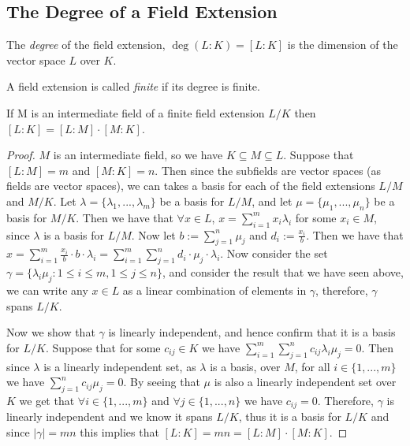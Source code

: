 \subsection{The Degree of a Field Extension}
\begin{definition}
    The \textit{degree} of the field extension, $\deg(L:K)=[L:K]$ is the dimension of the vector space $L$ over $K$.
\end{definition}
\begin{definition}
    A field extension is called \textit{finite} if its degree is finite. 
\end{definition}
\begin{theorem} \label{thm:tower-theorem}
    If M is an intermediate field of a finite field extension $L/K$ then
$
    [L:K] = [L:M]\cdot[M:K]
$. 
\end{theorem}
\begin{proof}
$M$ is an intermediate field, so we have $K \subseteq M \subseteq L$. Suppose that $[L:M]=m$ and $[M:K]=n$. Then since the subfields are vector spaces (as fields are vector spaces), we can takes a basis for each of the field extensions $L/M$ and $M/K$.
Let $\lambda = \{\lambda_1,...,\lambda_m\}$ be a basis for $L/M$, and let $\mu = \{\mu_1,...,\mu_n\}$ be a basis for $M/K$. Then we have that $\forall x \in L$, $x = \sum^m_{i=1}x_i\lambda_i$ for some $x_i \in M$, since $\lambda$ is a basis for $L/M$. Now let $b:=\sum^n_{j=1}\mu_j$ and $d_i:=\frac{x_i}{b}$. Then we have that $x=\sum^m_{i=1}\frac{x_i}{b}\cdot b \cdot \lambda_i = \sum^m_{i=1}\sum^n_{j=1}d_i\cdot \mu_j \cdot \lambda_i$. Now consider the set $\gamma=\{\lambda_i\mu_j : 1\leq i \leq m, 1\leq j \leq n\}$, and consider the result that we have seen above, we can write any $x \in L$ as a linear combination of elements in $\gamma$, therefore, $\gamma$ spans $L/K$.

Now we show that $\gamma$ is linearly independent, and hence confirm that it is a basis for $L/K$. Suppose that for some $c_{ij} \in K$ we have $\sum^m_{i=1} \sum^n_{j=1} c_{ij}\lambda_i\mu_j = 0 $. Then since $\lambda$ is a linearly independent set, as $\lambda$ is a basis, over $M$, for all $i \in \{1,...,m\}$ we have $\sum^n_{j=1} c_{ij}\mu_j = 0 $. By seeing that $\mu$ is also a linearly independent set over $K$ we get that $\forall i \in \{1,...,m\}$ and $\forall j \in \{1,...,n\}$ we have $c_{ij} = 0$. Therefore, $\gamma$ is linearly independent and we  know it spans $L/K$, thus it is a basis for $L/K$ and since $|\gamma|=mn$ this implies that $[L:K] = mn = [L:M]\cdot[M:K]$.

\end{proof}

